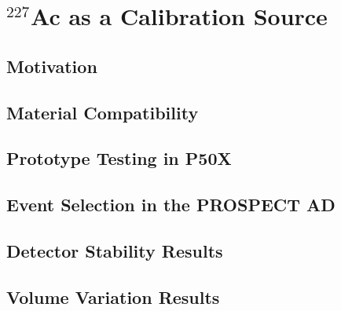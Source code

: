 \chapter{$^{227}$Ac as a Calibration Source}

\section{Motivation}

\section{Material Compatibility}

\section{Prototype Testing in P50X}

\section{Event Selection in the PROSPECT AD}

\section{Detector Stability Results}

\section{Volume Variation Results}

